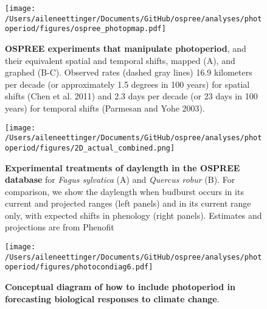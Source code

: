 \documentclass{article}
\begin{document}
\begin{figure}[p]
\centering
\texttt{[image: /Users/aileneettinger/Documents/GitHub/ospree/analyses/photoperiod/figures/ospree\_photopmap.pdf]} 
\caption{\textbf{OSPREE experiments that manipulate photoperiod}, and their equivalent spatial and temporal shifts, mapped (A), and graphed (B-C). Observed rates (dashed gray lines) 16.9 kilometers per decade (or approximately 1.5 degrees in 100 years) for spatial shifts (Chen et al. 2011) and 2.3 days per decade (or 23 days in 100 years) for temporal shifts (Parmesan and Yohe 2003).}
 \label{fig:photomap}
 \end{figure}


 
 
\begin{figure}[p]
\texttt{[image: /Users/aileneettinger/Documents/GitHub/ospree/analyses/photoperiod/figures/2D\_actual\_combined.png]} 
\caption{\textbf{Experimental treatments of daylength in the OSPREE database} for \textit{Fagus sylvatica} (A) and \textit{Quercus robur} (B). For comparison, we show the daylength when budburst occurs in its current and projected ranges (left panels) and in its current range only, with expected shifts in phenology (right panels). Estimates and projections are from Phenofit \citep{duputie2015}}
 \label{fig:fagus}
 \end{figure}
 
\begin{figure}[p]
\texttt{[image: /Users/aileneettinger/Documents/GitHub/ospree/analyses/photoperiod/figures/photocondiag6.pdf]} 
\caption{\textbf{Conceptual diagram of how to include photoperiod in forecasting biological responses to climate change}.}
 \label{fig:condiag}
 \end{figure}
 
\end{document}
